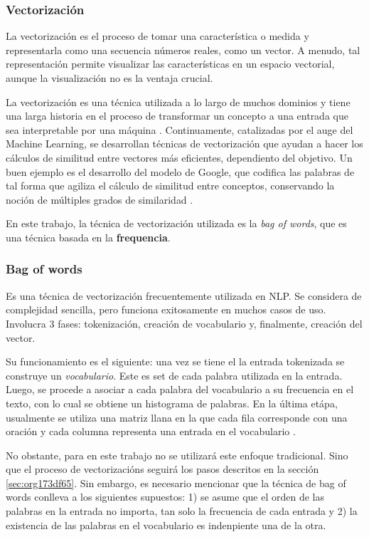 \documentclass[12pt,letterpaper,twoside]{article}
\begin{document}
\subsubsection{Vectorización}
\label{sec:orgbc5dad3}
La vectorización es el proceso de tomar una característica o medida
y representarla como una secuencia números reales, como un vector. A menudo,
tal representación permite visualizar las características en un espacio
vectorial, aunque la visualización no es la ventaja crucial.

La vectorización es una técnica utilizada a lo largo de muchos
dominios y tiene una larga historia en el proceso de transformar
un concepto a una entrada que sea interpretable por una máquina
\cite{jha_abhishek_vectorization}.  Continuamente, catalizadas por
el auge del Machine Learning, se desarrollan técnicas de
vectorización que ayudan a hacer los cálculos de similitud entre
vectores más eficientes, dependiento del objetivo. Un buen
ejemplo es el desarrollo del modelo de Google, que
codifica las palabras de tal forma que agiliza el cálculo
de similitud entre conceptos, conservando la noción
de múltiples grados de similaridad \cite{mikolov2013efficient}.

En este trabajo, la técnica de vectorización utilizada es
la \emph{bag of words}, que es una técnica basada en la \textbf{frequencia}.

\subsubsection{Bag of words}
\label{sec:org131a2f2}

Es una técnica de vectorización frecuentemente utilizada en NLP.
Se considera de complejidad sencilla, pero funciona exitosamente
en muchos casos de uso. Involucra 3 fases: tokenización, creación de vocabulario y,
finalmente, creación del vector.

Su funcionamiento es el siguiente: una vez se tiene el la entrada
tokenizada se construye un \emph{vocabulario}.  Este es set de cada
palabra utilizada en la entrada.  Luego, se procede a asociar a
cada palabra del vocabulario a su frecuencia en el texto, con lo
cual se obtiene un histograma de palabras. En la última etápa,
usualmente se utiliza una matriz llana en la que cada fila
corresponde con una oración y cada columna representa una entrada
en el vocabulario \cite{jha_abhishek_vectorization}.

No obstante, para en este trabajo no se utilizará este enfoque
tradicional.  Sino que el proceso de vectorizacións seguirá los
pasos descritos en la sección \ref{sec:org173df65}. Sin embargo,
es necesario mencionar que la técnica de bag of words conlleva
a los siguientes supuestos: 1) se asume que el orden de las
palabras en la entrada no importa, tan solo la frecuencia
de cada entrada y 2) la existencia de las palabras en el
vocabulario es indenpiente una de la otra.  
\end{document}
